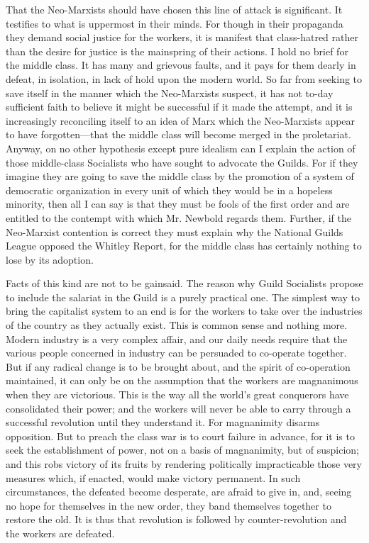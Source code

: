 \documentclass{book}
\begin{document}
That the Neo-Marxists should have chosen this line of attack is significant. It testifies to what is uppermost in their minds. For though in their propaganda they demand social justice for the workers, it is manifest that class-hatred rather than the desire for justice is the mainspring of their actions. I hold no brief for the middle class. It has many and grievous faults, and it pays for them dearly in defeat, in isolation, in lack of hold upon the modern world. So far from seeking to save itself in the manner which the Neo-Marxists suspect, it has not to-day sufficient faith to believe it might be successful if it made the attempt, and it is increasingly reconciling itself to an idea of Marx which the Neo-Marxists appear to have forgotten—that the middle class will become merged in the proletariat. Anyway, on no other hypothesis except pure idealism can I explain the action of those middle-class Socialists who have sought to advocate the Guilds. For if they imagine they are going to save the middle class by the promotion of a system of democratic organization in every unit of which they would be in a hopeless minority, then all I can say is that they must be fools of the first order and are entitled to the contempt with which Mr. Newbold regards them. Further, if the Neo-Marxist contention is correct they must explain why the National Guilds League opposed the Whitley Report, for the middle class has certainly nothing to lose by its adoption.

Facts of this kind are not to be gainsaid. The reason why Guild Socialists propose to include the salariat in the Guild is a purely practical one. The simplest way to bring the capitalist system to an end is for the workers to take over the industries of the country as they actually exist. This is common sense and nothing more. Modern industry is a very complex affair, and our daily needs require that the various people concerned in industry can be persuaded to co-operate together. But if any radical change is to be brought about, and the spirit of co-operation maintained, it can only be on the assumption that the workers are magnanimous when they are victorious. This is the way all the world’s great conquerors have consolidated their power; and the workers will never be able to carry through a successful revolution until they understand it. For magnanimity disarms opposition. But to preach the class war is to court failure in advance, for it is to seek the establishment of power, not on a basis of magnanimity, but of suspicion; and this robs victory of its fruits by rendering politically impracticable those very measures which, if enacted, would make victory permanent. In such circumstances, the defeated become desperate, are afraid to give in, and, seeing no hope for themselves in the new order, they band themselves together to restore the old. It is thus that revolution is followed by counter-revolution and the workers are defeated.
\end{document}
